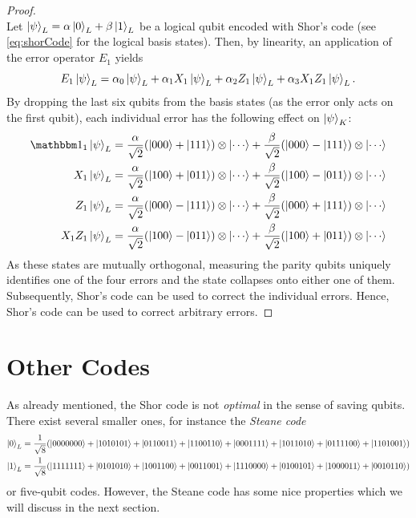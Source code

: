\begin{proof}
\begin{equation}
				\end{equation}
				Let \( \ket{\psi}_L = \alpha \ket{0}_L + \beta \ket{1}_L \) be a logical qubit encoded with Shor's code (see \eqref{eq:shorCode} for the logical basis states). Then, by linearity, an application of the error operator \(E_1\) yields
				\begin{equation}
					E_1 \ket{\psi}_L = \alpha_0 \ket{\psi}_L + \alpha_1 X_1 \ket{\psi}_L + \alpha_2 Z_1 \ket{\psi}_L + \alpha_3 X_1 Z_1 \ket{\psi}_L.
				\end{equation}
				By dropping the last six qubits from the basis states (as the error only acts on the first qubit), each individual error has the following effect on \( \ket{\psi}_K \):
				\begin{align}
					  \ID_1 \ket{\psi}_L &= \frac{\alpha}{\sqrt{2}} (\ket{000} + \ket{111}) \otimes \ket{\cdots} + \frac{\beta}{\sqrt{2}} (\ket{000} - \ket{111}) \otimes \ket{\cdots} \\
					    X_1 \ket{\psi}_L &= \frac{\alpha}{\sqrt{2}} (\ket{100} + \ket{011}) \otimes \ket{\cdots} + \frac{\beta}{\sqrt{2}} (\ket{100} - \ket{011}) \otimes \ket{\cdots} \\
					    Z_1 \ket{\psi}_L &= \frac{\alpha}{\sqrt{2}} (\ket{000} - \ket{111}) \otimes \ket{\cdots} + \frac{\beta}{\sqrt{2}} (\ket{000} + \ket{111}) \otimes \ket{\cdots} \\
					X_1 Z_1 \ket{\psi}_L &= \frac{\alpha}{\sqrt{2}} (\ket{100} - \ket{011}) \otimes \ket{\cdots} + \frac{\beta}{\sqrt{2}} (\ket{100} + \ket{011}) \otimes \ket{\cdots}
				\end{align}
				As these states are mutually orthogonal, measuring the parity qubits uniquely identifies one of the four errors and the state collapses onto either one of them. Subsequently, Shor's code can be used to correct the individual errors. Hence, Shor's code can be used to correct arbitrary errors.
			\end{proof}

	\section{Other Codes}
		\label{subsec:otherCodes}

		As already mentioned, the Shor code is not \emph{optimal} in the sense of saving qubits. There exist several smaller ones, for instance the \emph{Steane code}
		\begin{align}
			\ket{0}_L &= \frac{1}{\sqrt{8}} (\ket{0000000} + \ket{1010101} + \ket{0110011} + \ket{1100110} + \ket{0001111} + \ket{1011010} + \ket{0111100} + \ket{1101001}) \\
			\ket{1}_L &= \frac{1}{\sqrt{8}} (\ket{1111111} + \ket{0101010} + \ket{1001100} + \ket{0011001} + \ket{1110000} + \ket{0100101} + \ket{1000011} + \ket{0010110})
		\end{align}
		or five-qubit codes. However, the Steane code has some nice properties which we will discuss in the next section.

